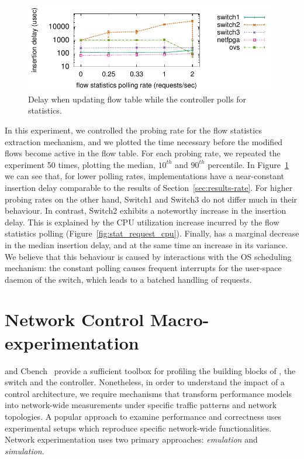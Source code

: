 \begin{figure}[t]
  \begin{center}
    \includegraphics[width=0.99\textwidth]{Chapter1/Chapter1Figs/interaction_test}
  \end{center}
  \caption{Delay when updating  flow table while the controller polls
    for statistics.}
  \label{fig:interaction_test}
\end{figure}

In this experiment, we controlled the probing rate for the flow statistics
extraction mechanism, and we plotted the time necessary before the modified flows
become active in the flow table. For each probing rate, we repeated the experiment
50 times, plotting the median, $10^{th}$ and $90^{th}$ percentile. In
Figure~\ref{fig:interaction_test} we can see that, for lower polling rates,
implementations have a near-constant insertion delay comparable to the results
of Section~\ref{sec:results-rate}.  For higher probing rates on the other hand,
Switch1 and Switch3 do not differ much in their behaviour. In contrast, Switch2
exhibits a noteworthy increase in the insertion delay. This is explained by the
CPU utilization increase incurred by the flow statistics polling
(Figure~\ref{fig:stat_request_cpu}). Finally, \ovs has a marginal decrease
in the median insertion delay, and at the same time an increase in its variance.
We believe that this behaviour is caused by interactions with the OS scheduling
mechanism: the constant polling causes frequent interrupts for the user-space
daemon of the switch, which leads to a batched handling of requests.

\section{Network Control Macro-experimentation} \label{sec:sdnsim-intro}

\oflops and Cbench~ provide a sufficient toolbox for profiling the
building blocks of \of, the switch and the controller.  Nonetheless, in order to
understand the impact of a control architecture, we require
mechanisms that transform \of performance models into network-wide measurements
under specific traffic patterns and network topologies.  A popular approach to
examine performance and correctness uses experimental setups which
reproduce specific network-wide functionalities.  Network experimentation uses
two primary approaches: \textit{emulation} and \textit{simulation}.

